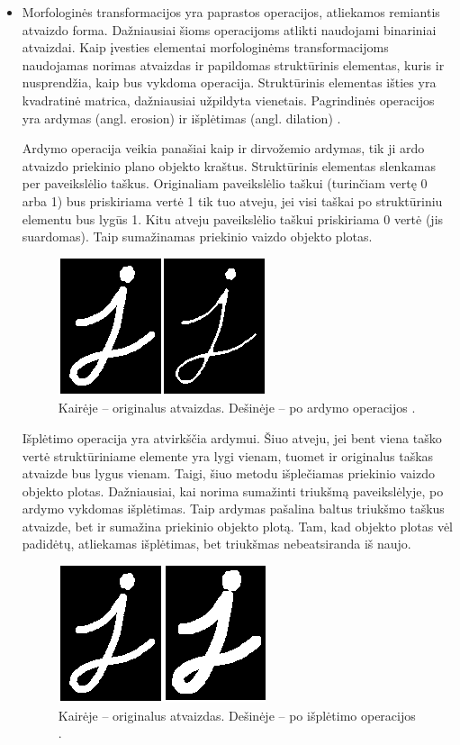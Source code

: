 \documentclass[a4paper,12pt]{article}
\begin{document}
\begin{itemize}
	\item Morfologinės transformacijos yra paprastos operacijos, atliekamos remiantis atvaizdo forma. Dažniausiai šioms operacijoms atlikti naudojami binariniai atvaizdai. Kaip įvesties elementai morfologinėms transformacijoms naudojamas norimas atvaizdas ir papildomas struktūrinis elementas, kuris ir nusprendžia, kaip bus vykdoma operacija. Struktūrinis elementas išties yra kvadratinė matrica, dažniausiai užpildyta vienetais. Pagrindinės operacijos yra ardymas (angl. erosion) ir išplėtimas (angl. dilation) \cite{MORPHOLOGIC}.
	
	Ardymo operacija veikia panašiai kaip ir dirvožemio ardymas, tik ji ardo atvaizdo priekinio plano objekto kraštus. Struktūrinis elementas slenkamas per paveikslėlio taškus. Originaliam paveikslėlio taškui (turinčiam vertę 0 arba 1) bus priskiriama vertė 1 tik tuo atveju, jei visi taškai po struktūriniu elementu bus lygūs 1. Kitu atveju paveikslėlio taškui priskiriama 0 vertė (jis suardomas). Taip sumažinamas priekinio vaizdo objekto plotas.
			\begin{figure}[H]
				\centering
				\includegraphics[scale=0.5]{images/erosion1}
				\caption{Kairėje – originalus atvaizdas. Dešinėje – po ardymo operacijos \cite{MORPHOLOGIC}.}   %
				\label{img:erosion1}
			\end{figure} 
	
	Išplėtimo operacija yra atvirkščia ardymui. Šiuo atveju, jei bent viena taško vertė struktūriniame elemente yra lygi vienam, tuomet ir originalus taškas atvaizde bus lygus vienam. Taigi, šiuo metodu išplečiamas priekinio vaizdo objekto plotas. Dažniausiai, kai norima sumažinti triukšmą paveikslėlyje, po ardymo vykdomas išplėtimas. Taip ardymas pašalina baltus triukšmo taškus atvaizde, bet ir sumažina priekinio objekto plotą. Tam, kad objekto plotas vėl padidėtų, atliekamas išplėtimas, bet triukšmas nebeatsiranda iš naujo.
				\begin{figure}[H]
					\centering
					\includegraphics[scale=0.4]{images/dilation}
					\caption{Kairėje – originalus atvaizdas. Dešinėje – po išplėtimo operacijos \cite{MORPHOLOGIC}.}   %
					\label{img:dilation}
				\end{figure} 
				

\end{itemize}
\end{document}
